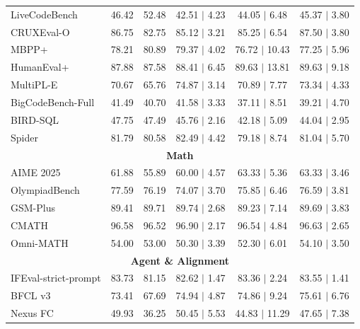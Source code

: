 \begin{table}[htbp]
{\begin{tabular}{lcc|ccc}
\midrule
LiveCodeBench & 46.42 & 52.48 & 42.51 $\mid$ 4.23 & 44.05 $\mid$ 6.48  & 45.37 $\mid$ 3.80 \\
CRUXEval-O & 86.75 & 82.75 & 85.12 $\mid$ 3.21 & 85.25 $\mid$ 6.54  & 87.50 $\mid$ 3.80 \\
MBPP+ & 78.21 & 80.89 & 79.37 $\mid$ 4.02 & 76.72 $\mid$ 10.43  & 77.25 $\mid$ 5.96 \\
HumanEval+ & 87.88 & 87.58 & 88.41 $\mid$ 6.45 & 89.63 $\mid$ 13.81  & 89.63 $\mid$ 9.18 \\
MultiPL-E & 70.67 & 65.76 & 74.87 $\mid$ 3.14 & 70.89 $\mid$ 7.77  & 73.34 $\mid$ 4.33 \\
BigCodeBench-Full & 41.49 & 40.70 & 41.58 $\mid$ 3.33 & 37.11 $\mid$ 8.51 & 39.21 $\mid$ 4.70 \\
BIRD-SQL & 47.75 & 47.49 & 45.76 $\mid$ 2.16 & 42.18 $\mid$ 5.09 &  44.04 $\mid$ 2.95 \\
Spider & 81.79 & 80.58 & 82.49 $\mid$ 4.42 & 79.18 $\mid$ 8.74 &  81.04 $\mid$ 5.70 \\
\midrule
\multicolumn{6}{c}{\textbf{Math}} \\
\midrule
AIME 2025 & 61.88 & 55.89 & 60.00 $\mid$ 4.57 & 63.33 $\mid$ 5.36 &  63.33 $\mid$ 3.46 \\
OlympiadBench & 77.59 & 76.19 & 74.07 $\mid$ 3.70 & 75.85 $\mid$ 6.46 &  76.59 $\mid$ 3.81 \\
GSM-Plus & 89.41 & 89.71 & 89.74 $\mid$ 2.68 & 89.23 $\mid$ 7.14 &  89.69 $\mid$ 3.83 \\
CMATH & 96.58 & 96.52 & 96.90 $\mid$ 2.17 & 96.54 $\mid$ 4.84 &  96.63 $\mid$ 2.65 \\
Omni-MATH & 54.00 & 53.00 & 50.30 $\mid$ 3.39 & 52.30 $\mid$ 6.01 &  54.10 $\mid$ 3.50 \\
\midrule
\multicolumn{6}{c}{\textbf{Agent \& Alignment}} \\
\midrule
IFEval-strict-prompt & 83.73 & 81.15 & 82.62 $\mid$ 1.47 & 83.36 $\mid$ 2.24 & 83.55 $\mid$ 1.41 \\
BFCL v3 & 73.41 & 67.69 & 74.94 $\mid$ 4.87 & 74.86 $\mid$ 9.24 &  75.61 $\mid$ 6.76 \\
Nexus FC & 49.93 & 36.25 & 50.45 $\mid$ 5.53 & 44.83 $\mid$ 11.29 &  47.65 $\mid$ 7.38 \\
\bottomrule
\end{tabular}

}
\end{table}
